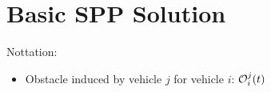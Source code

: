 \section{Basic SPP Solution\label{sec:basic}}
Nottation:
\begin{itemize}
\item Obstacle induced by vehicle $j$ for vehicle $i$: $\mathcal{O}_i^j(t)$
\end{itemize}
